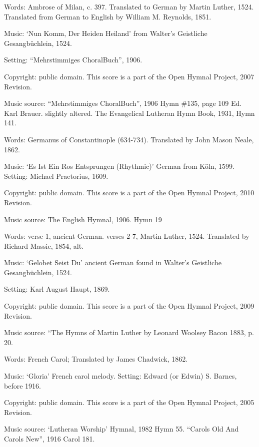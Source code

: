 \begin{multicols}{2}
\par\noindent
Words: Ambrose of Milan, c. 397.  Translated to German by Martin Luther, 1524. Translated from German to English by William M. Reynolds, 1851. 
\par\noindent
Music: `Nun Komm, Der Heiden Heiland' from Walter's Geistliche Gesangbüchlein, 1524.
\par\noindent
Setting: ``Mehrstimmiges ChoralBuch'', 1906.
\par\noindent
Copyright: public domain. This score is a part of the Open Hymnal Project, 2007 Revision.
\par\noindent
Music source: ``Mehrstimmiges ChoralBuch'', 1906 Hymn \#135, page 109 Ed. Karl Brauer. slightly altered. The Evangelical Lutheran Hymn Book, 1931, Hymn 141.

\par\noindent
Words: Germanus of Constantinople (634-734).  Translated by John Mason Neale, 1862. 
\par\noindent
Music: `Es Ist Ein Ros Entsprungen (Rhythmic)' German from Köln, 1599.  Setting: Michael Praetorius, 1609.
\par\noindent
Copyright: public domain. This score is a part of the Open Hymnal Project, 2010 Revision.
\par\noindent
Music source: The English Hymnal, 1906.  Hymn 19

\par\noindent
Words: verse 1, ancient German.  verses 2-7, Martin Luther, 1524.  Translated by Richard Massie, 1854, alt. 
\par\noindent
Music: `Gelobet Seist Du' ancient German found in Walter's Geistliche Gesangbüchlein, 1524. 
\par\noindent
Setting: Karl August Haupt, 1869.
\par\noindent
Copyright: public domain. This score is a part of the Open Hymnal Project, 2009 Revision.
\par\noindent
Music source: ``The Hymns of Martin Luther by Leonard Woolsey Bacon 1883, p. 20.

\par\noindent
Words: French Carol; Translated by James Chadwick, 1862. 
\par\noindent
Music: `Gloria' French carol melody.  Setting: Edward (or Edwin) S. Barnes, before 1916.
\par\noindent
Copyright: public domain. This score is a part of the Open Hymnal Project, 2005 Revision.
\par\noindent
Music source: `Lutheran Worship' Hymnal, 1982 Hymn 55. ``Carols Old And Carols New'', 1916 Carol 181.


\end{multicols}
